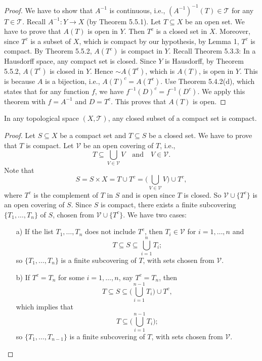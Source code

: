 \begin{proof}
We have to show that \(A^{-1}\) is continuous, i.e., \((A^{-1})^{-1}(T) \in \mathcal{T}\) for any \(T \in \mathcal{T}\). Recall \(A^{-1}: Y \to X\) (by Theorem 5.5.1).
Let \(T \subseteq X\) be an open set. We have to prove that \(A(T)\) is open in \(Y\). Then \(T^c\) is a closed set in \(X\). Moreover, since \(T^c\) is a subset of \(X\), which is compact by our hypothesis, by Lemma 1, \(T^c\) is compact.
By Theorem 5.5.2, \(A(T^c)\) is compact in \(Y\). Recall Theorem 5.3.3: In a Hausdorff space, any compact set is closed. Since \(Y\) is Hausdorff, by Theorem 5.5.2, \(A(T^c)\) is closed in \(Y\).
Hence \(\sim A(T^c)\), which is \(A(T)\), is open in \(Y\). This is because \(A\) is a bijection, i.e., \(A(T)^c = A(T^c)\).
Use Theorem 5.4.2(d), which states that for any function \(f\), we have \(f^{-1}(D)^c = f^{-1}(D^c)\). We apply this theorem with \(f = A^{-1}\) and \(D = T^c\).
This proves that \(A(T)\) is open.
\end{proof}

\begin{lemma}
In any topological space \((X,\mathcal{T})\), any closed subset of a compact set is compact.
\end{lemma}
\begin{proof}
    Let \( S \subseteq X \) be a compact set and \( T \subseteq S \) be a closed set. We have to prove that \( T \) is compact.
    Let \( \mathcal{V} \) be an open covering of \( T \), i.e., 
\[ T \subseteq \bigcup_{V \in \mathcal{V}} V \quad \text{and} \quad V \in \mathcal{V}. \]
Note that 
\[ S = S \times X = T \cup T^c = \bigg(\bigcup_{V \in \mathcal{V}} V\bigg) \cup T^c, \]
where \( T^c \) is the complement of \( T \) in \( S \) and is open since \( T \) is closed.
So \( \mathcal{V} \cup \{T^c\} \) is an open covering of \( S \). Since \( S \) is compact, there exists a finite subcovering \( \{T_1, \ldots, T_n\} \) of \( S \), chosen from \( \mathcal{V} \cup \{T^c\} \).
We have two cases:
\begin{enumerate}
    \item[a)] If the list \( T_1, \ldots, T_n \) does not include \( T^c \), then \( T_i \in \mathcal{V} \) for \( i = 1, \ldots, n \) and 
    \[ T \subseteq S \subseteq \bigcup_{i=1}^{n} T_i; \]
    so \( \{T_1, \ldots, T_n\} \) is a finite subcovering of \( T \), with sets chosen from \( \mathcal{V} \).
    \item[b)] If \( T^c = T_n \) for some \( i = 1, \ldots, n \), say \( T^c = T_n \), then 
    \[ T \subseteq S \subseteq \bigg(\bigcup_{i=1}^{n-1} T_i\bigg) \cup T^c, \]
    which implies that 
    \[ T \subseteq \bigg(\bigcup_{i=1}^{n-1} T_i\bigg); \]
    so \( \{T_1, \ldots, T_{n-1}\} \) is a finite subcovering of \( T \), with sets chosen from \( \mathcal{V} \).
\end{enumerate}

\end{proof}

